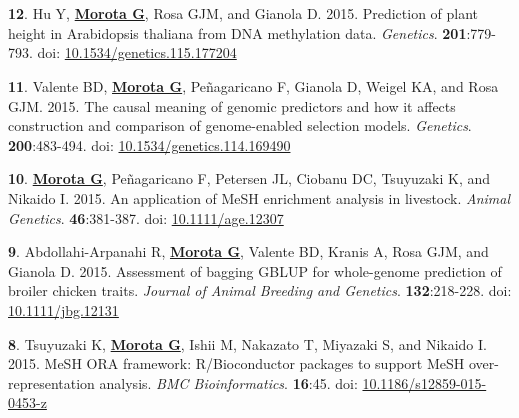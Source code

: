 \documentclass[margin,line,10pt]{res}
\newenvironment{list1}{
  \begin{list}{\ding{113}}{%
      \setlength{\itemsep}{0in}
      \setlength{\parsep}{0in} \setlength{\parskip}{0in}
      \setlength{\topsep}{0in} \setlength{\partopsep}{0in} 
      \setlength{\leftmargin}{0.17in}}}{\end{list}}
\begin{document}
\begin{resume}
\begin{list1}
\end{list1}
  
\section{}

\begin{list1}

\item [{\bf 12}.]  Hu Y, {\bf \underline{Morota G}}, Rosa GJM, and Gianola D. 2015. Prediction of plant height in Arabidopsis thaliana from DNA methylation data. \emph{Genetics}. \textbf{201}:779-793. doi: \textcolor{blue}{\href{http://dx.doi.org/10.1534/genetics.115.177204}{10.1534/genetics.115.177204}} 

\vspace{0.5cm}

\item [{\bf 11}.]  Valente BD, {\bf \underline{Morota G}}, Pe\~{n}agaricano F, Gianola D, Weigel KA, and Rosa GJM. 2015. The causal meaning of genomic predictors and how it affects  construction and comparison of genome-enabled selection models. \emph{Genetics}. \textbf{200}:483-494. doi: \textcolor{blue}{\href{http://dx.doi.org/10.1534/genetics.114.169490}{10.1534/genetics.114.169490}} 

\vspace{0.5cm}

\item [{\bf 10}.] {\bf \underline{Morota G}}, Pe\~{n}agaricano F, Petersen JL, Ciobanu DC, Tsuyuzaki K, and Nikaido I. 2015. An application of MeSH enrichment analysis in livestock. \emph{Animal Genetics}. \textbf{46}:381-387. doi: \textcolor{blue}{\href{http://dx.doi.org/10.1111/age.12307}{10.1111/age.12307}} 

\vspace{0.5cm}

\item [{\bf 9}.] Abdollahi-Arpanahi R, {\bf \underline{Morota G}}, Valente BD, Kranis A, Rosa GJM, and Gianola D. 2015. Assessment of bagging GBLUP for whole-genome prediction of broiler chicken traits. \emph{Journal of Animal Breeding and Genetics}. \textbf{132}:218-228. doi: \textcolor{blue}{\href{http://dx.doi.org/10.1111/jbg.12131}{10.1111/jbg.12131}} 

\vspace{0.5cm}

\item [{\bf 8}.]  Tsuyuzaki K, {\bf \underline{Morota G}}, Ishii M, Nakazato T, Miyazaki S, and Nikaido I. 2015. 
  MeSH ORA framework: R/Bioconductor packages to support MeSH over-representation analysis. \emph{BMC Bioinformatics}. {\bf 16}:45. doi: \textcolor{blue}{\href{http://dx.doi.org/10.1186/s12859-015-0453-z}{10.1186/s12859-015-0453-z}} 


\end{list1}
\end{resume}
\end{document}

